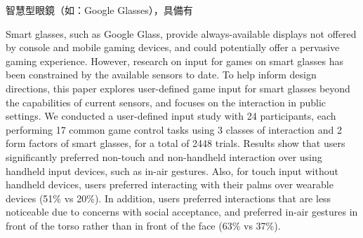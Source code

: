 \begin{abstractzh}
智慧型眼鏡（如：Google Glasses），具備有
\end{abstractzh}

\begin{abstracten}

Smart glasses, such as Google Glass, provide always-available displays not offered by console and mobile gaming devices, and could potentially offer a pervasive gaming experience. 
However, research on input for games on smart glasses has been constrained by the available sensors to date. 
To help inform design directions, this paper explores user-defined game input for smart glasses beyond the capabilities of current sensors, and focuses on the interaction in public settings. 
We conducted a user-defined input study with 24 participants, each performing 17 common game control tasks using 3 classes of interaction and 2 form factors of smart glasses, for a total of 2448 trials. 
Results show that users significantly preferred non-touch and non-handheld interaction over using handheld input devices, such as in-air gestures. Also, for touch input without handheld devices, users preferred interacting with their palms over wearable devices (51\% vs 20\%). 
In addition, users preferred interactions that are less noticeable due to concerns with social acceptance, and preferred in-air gestures in front of the torso rather than in front of the face (63\% vs 37\%). 

\end{abstracten}

\begin{comment}
\category{K.8.0.}{General}Games; {H.5.2.}{Information Interfaces}

\terms{Design, Human factors, Performance.}

\keywords{Game; input; Control; Smart glasses; Guessability; User-defined; Public space; Pervasive gaming; Wearable.}
\end{comment}

